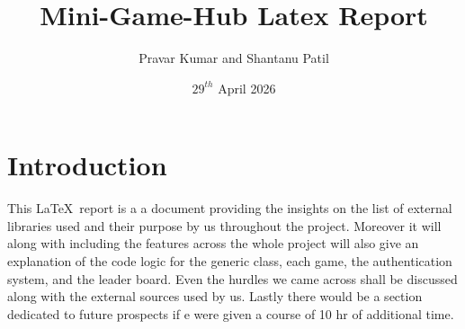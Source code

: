 \documentclass{article}
\title{Mini-Game-Hub Latex Report}
\author{Pravar Kumar and Shantanu Patil}
\date{${29^{th}}$ April 2026}
\begin{document}
\maketitle

\section*{Introduction }
This \LaTeX\ report is a a document providing the insights on the  list of external libraries used and their purpose by us throughout the project. Moreover it will along with including the features across the whole project will also give  an explanation of the code logic for the generic class, each game, the authentication
system, and the leader board. Even the hurdles we came across shall be discussed along with the external sources used by us. Lastly there would be a section dedicated to future prospects if e were given a course of 10 hr of additional time.
\end{document}
